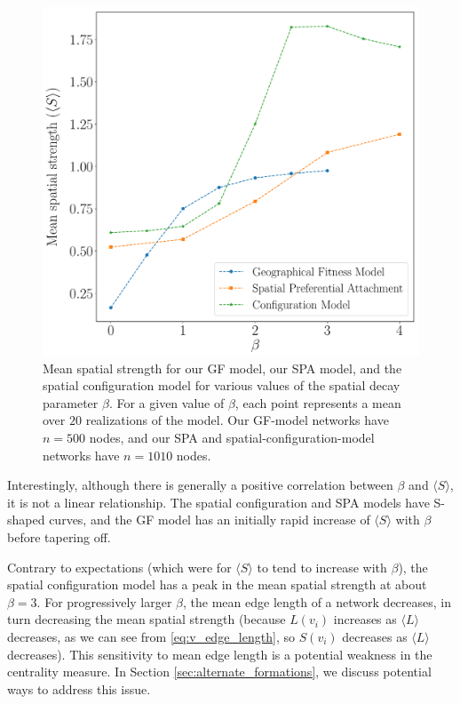 \documentclass[%
 reprint,
 amsmath,amssymb,
 aps,
]{revtex4-1}
\begin{document}
\begin{figure}
    \centering
    \includegraphics[width=1.0\linewidth]{spatial_model_spatial_strengths2.pdf}
    \caption{Mean spatial strength for our GF model, our SPA model, and the spatial configuration model for various values of the spatial decay parameter $\beta$. For a given value of $\beta$, each point represents a mean over $20$ realizations of the model. Our GF-model networks have $n=500$ nodes, and our SPA and spatial-configuration-model networks have $n=1010$ nodes.
    }
    \label{fig:spatial_model_strength}
\end{figure}


Interestingly, although there is generally a positive correlation between $\beta$ and $\langle S \rangle$, it is not a linear relationship. The spatial configuration and SPA models have S-shaped curves, and the GF model has an initially rapid increase of $\langle S \rangle$ with $\beta$ before tapering off.

Contrary to expectations (which were for $\langle S \rangle$ to tend to increase with $\beta$), the spatial configuration model has a peak in the mean spatial strength at about $\beta = 3$. For progressively larger $\beta$, the mean edge length of a network decreases, in turn decreasing the mean spatial strength (because $L(v_i)$ increases as $\langle L \rangle$ decreases, as we can see from \eqref{eq:v_edge_length}, so $S(v_i)$ decreases as $\langle L \rangle$ decreases). This sensitivity to mean edge length is a potential weakness in the centrality measure. In Section \ref{sec:alternate_formations}, we discuss potential ways to address this issue.
\end{document}
